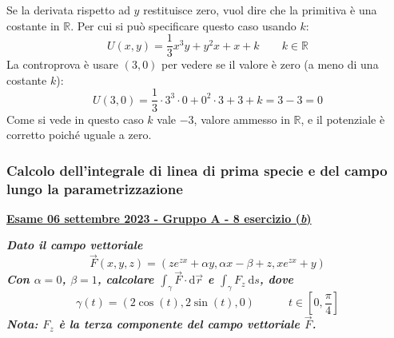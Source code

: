 \documentclass[a4paper]{article}
\newcommand{\definition}[1]{\textcolor{Red3}{\textbf{#1}}}
\newcommand{\example}[1]{\textcolor{Green4}{\textbf{#1}}}
\begin{document}
	Se la derivata rispetto ad $y$ restituisce zero, vuol dire che la primitiva è una costante in $\mathbb{R}$. Per cui si può specificare questo caso usando $k$:
	\begin{equation*}
		U\left(x,y\right) = \dfrac{1}{3}x^{3}y + y^{2}x + x + k \hspace{2em} k \in \mathbb{R}
	\end{equation*}
	La controprova è usare $\left(3,0\right)$ per vedere se il valore è zero (a meno di una costante $k$):
	\begin{equation*}
		U\left(3,0\right) = \dfrac{1}{3}\cdot 3^{3} \cdot 0 + 0^{2} \cdot 3 + 3 + k = 3 - 3 = 0
	\end{equation*}
	Come si vede in questo caso $k$ vale $-3$, valore ammesso in $\mathbb{R}$, e il potenziale è corretto poiché uguale a zero.

	\newpage

	\subsubsection{Calcolo dell'integrale di linea di prima specie e del campo lungo la parametrizzazione}

	\begin{flushleft}
		\label{exam: esame 06 settembre 2023 - Gruppo A - 8 esercizio (b)}
		\hypertarget{
			exam: esame 06 settembre 2023 - Gruppo A - 8 esercizio (b)
		}{
			\definition{\underline{Esame 06 settembre 2023 - Gruppo A - 8 esercizio (\emph{b})}}
		}
	\end{flushleft}
	\example{\emph{Dato il campo vettoriale}
	\begin{equation*}
		\overset{\rightarrow}{F}\left(x,y,z\right) = \left(ze^{zx}+\alpha y, \alpha x - \beta + z, xe^{zx}+y\right)
	\end{equation*}
	\emph{Con $\alpha = 0$, $\beta = 1$, calcolare $\int_{\gamma} \overset{\rightarrow}{F} \cdot \mathrm{d}\overrightarrow{r}$ e $\int_{\gamma} F_{z} \:\mathrm{d}s$, dove}
	\begin{equation*}
		\gamma\left(t\right) = \left(2\cos\left(t\right), 2\sin\left(t\right), 0\right) \hspace{3em} t \in \left[0, \frac{\pi}{4}\right]
	\end{equation*}}
	\example{\emph{Nota: $F_{z}$ è la terza componente del campo vettoriale $\overset{\rightarrow}{F}$.}}\newline
	
\end{document}
